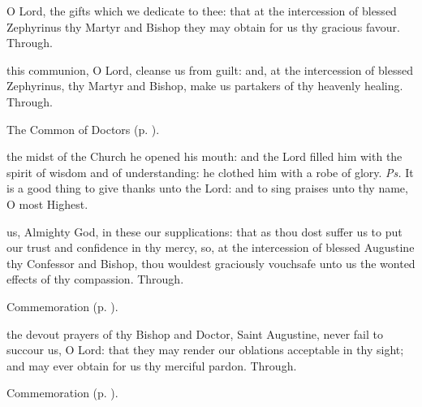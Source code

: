 \secret
{} O Lord, the gifts which we dedicate to thee: that at the intercession of blessed Zephyrinus thy Martyr and Bishop they may obtain for us thy gracious favour. Through.

\postcommunion
{} this communion, O Lord, cleanse us from guilt: and, at the intercession of blessed Zephyrinus, thy Martyr and Bishop, make us partakers of thy heavenly healing. Through.



\begin{rubric}
	The Common of Doctors (p. \pageref{CommonDoctors}).
\end{rubric}

\introit
{} the midst of the Church he opened his mouth: and the Lord filled him with the spirit of wisdom and of understanding: he clothed him with a robe of glory. \textit{Ps.} It is a good thing to give thanks unto the Lord: and to sing praises unto thy name, O most Highest.

\collect
{} us, Almighty God, in these our supplications: that as thou dost suffer us to put our trust and confidence in thy mercy, so, at the intercession of blessed Augustine thy Confessor and Bishop, thou wouldest graciously vouchsafe unto us the wonted effects of thy compassion. Through.

\begin{rubric}
    Commemoration  (p. \pageref{HermesCollect}).
\end{rubric}



\secret
{} the devout prayers of thy Bishop and Doctor, Saint Augustine, never fail to succour us, O Lord: that they may render our oblations acceptable in thy sight; and may ever obtain for us thy merciful pardon. Through.

\begin{rubric}
    Commemoration  (p. \pageref{HermesSecret}).
\end{rubric}

